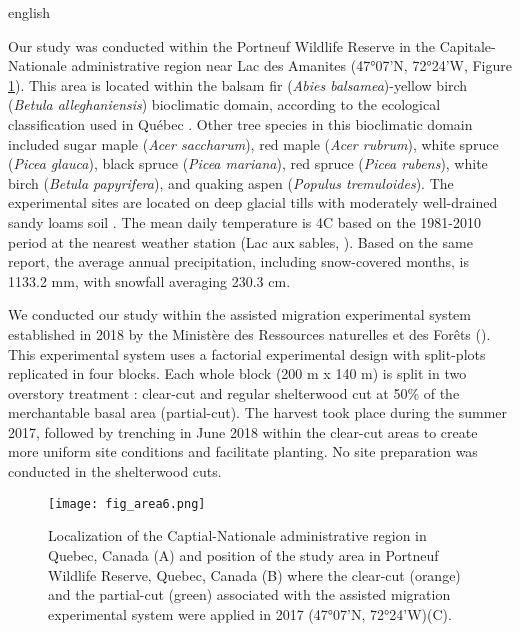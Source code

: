 \begin{otherlanguage*}{english}

  Our study was conducted within the Portneuf Wildlife Reserve in the Capitale-Nationale administrative region near Lac des Amanites (47°07’N, 72°24’W, Figure \ref{fig:area}). 
  This area is located within the balsam fir (\textit{Abies balsamea})-yellow birch (\textit{Betula alleghaniensis}) bioclimatic domain, according to the ecological classification used in Québec \citep{saucierChapitreEcologieForestiere2009}. 
  Other tree species in this bioclimatic domain included sugar maple (\textit{Acer saccharum}), red maple (\textit{Acer rubrum}), white spruce (\textit{Picea glauca}), black spruce (\textit{Picea mariana}), red spruce (\textit{Picea rubens}), white birch (\textit{Betula papyrifera}), and quaking aspen (\textit{Populus tremuloides})\citep{olaBelowgroundCarbonStocks2024}. 
  The experimental sites are located on deep glacial tills with moderately well-drained sandy loams soil \citep{CanadianSystemSoil1998}. 
  The mean daily temperature is 4C based on the 1981-2010 period at the nearest weather station (Lac aux sables, \citealp{environmentcanadaCanadianClimateNormals2019}). 
  Based on the same report, the average annual precipitation, including snow-covered months, is 1133.2 mm, with snowfall averaging 230.3 cm.

  We conducted our study within the assisted migration experimental system established in 2018 by the Ministère des Ressources naturelles et des Forêts (\citealp{royoDesiredREgenerationAssisted2023}). 
  This experimental system uses a factorial experimental design with split-plots replicated in four blocks. 
  Each whole block (200 m x 140 m) is split in two overstory treatment : clear-cut and regular shelterwood cut at 50\% of the merchantable basal area (partial-cut). 
  The harvest took place during the summer 2017, followed by trenching in June 2018 within the clear-cut areas to create more uniform site conditions and facilitate planting. 
  No site preparation was conducted in the shelterwood cuts.

\end{otherlanguage*}

\begin{figure}[ht!]
	\centering
	\texttt{[image: fig\_area6.png]}
	\caption[Localization of the Capitale-Nationale administrative region in Quebec, Canada and position of the study area near Lac des Amanites in Portneuf Wildlife Reserve, Quebec, Canada.]
  {Localization of the Captial-Nationale administrative region in Quebec, Canada (A) and position of the study area in Portneuf Wildlife Reserve, Quebec, Canada (B) where the clear-cut (orange) and the partial-cut (green) associated with the assisted migration experimental system were applied in 2017 (47°07'N, 72°24'W)(C).}
	\label{fig:area}
	\end{figure}  


